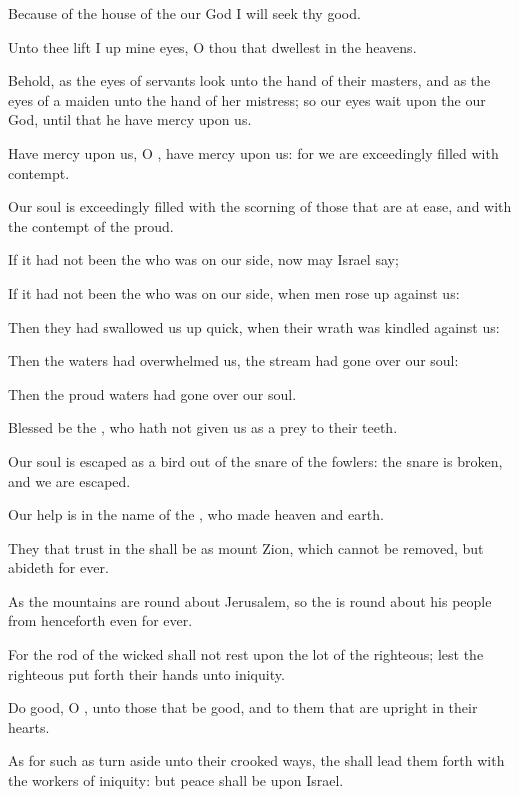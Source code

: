 \Verse Because of the house of the \LORD our God I will seek thy good.




\Chapter
\Verse Unto thee lift I up mine eyes, O thou that dwellest in the heavens.

\Verse Behold, as the eyes of servants look unto the hand of their masters, and as the eyes of a maiden unto the hand of her mistress; so our eyes wait upon the \LORD our God, until that he have mercy upon us.

\Verse Have mercy upon us, O \LORD, have mercy upon us: for we are exceedingly filled with contempt.

\Verse Our soul is exceedingly filled with the scorning of those that are at ease, and with the contempt of the proud.




\Chapter
\Verse If it had not been the \LORD who was on our side, now may Israel say;

\Verse If it had not been the \LORD who was on our side, when men rose up against us:

\Verse Then they had swallowed us up quick, when their wrath was kindled against us:

\Verse Then the waters had overwhelmed us, the stream had gone over our soul:

\Verse Then the proud waters had gone over our soul.

\Verse Blessed be the \LORD, who hath not given us as a prey to their teeth.

\Verse Our soul is escaped as a bird out of the snare of the fowlers: the snare is broken, and we are escaped.

\Verse Our help is in the name of the \LORD, who made heaven and earth.




\Chapter
\Verse They that trust in the \LORD shall be as mount Zion, which cannot be removed, but abideth for ever.

\Verse As the mountains are round about Jerusalem, so the \LORD is round about his people from henceforth even for ever.

\Verse For the rod of the wicked shall not rest upon the lot of the righteous; lest the righteous put forth their hands unto iniquity.

\Verse Do good, O \LORD, unto those that be good, and to them that are upright in their hearts.

\Verse As for such as turn aside unto their crooked ways, the \LORD shall lead them forth with the workers of iniquity: but peace shall be upon Israel.




